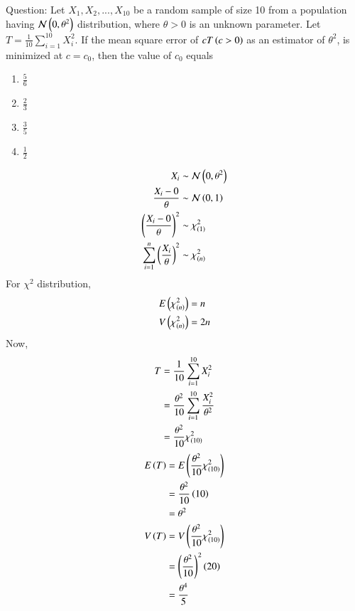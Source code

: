\documentclass[journal,12pt,onecolumn]{IEEEtran}
\theoremstyle{remark}
\begin{document}
%
Question:
Let $X_1, X_2, ..., X_{10}$ be a random sample of size 10 from a population having $\mathcal{N}\left(0,\theta^2\right)$ distribution, where $\theta > 0$ is an unknown parameter.
Let $T = \frac{1}{10}\sum^{10}_{i=1}{X_i^2}$. If the mean square error of $cT \left(c > 0\right)$ as an estimator of $\theta^2$, is minimized at $c = c_0$, then the value of $c_0$ equals
\begin{enumerate}[label =(\roman*)]
	\item $\frac{5}{6}$ \vspace{2pt}
	\item $\frac{2}{3}$ \vspace{2pt}
	\item $\frac{3}{5}$ \vspace{2pt}
	\item $\frac{1}{2}$ \vspace{2pt}
\end{enumerate}
\solution
\begin{align}
	X_i &\sim \mathcal{N}\left(0,\theta^2\right)\\
	\frac{X_i - 0}{\theta} &\sim \mathcal{N}\left(0,1\right)\\
	\left(\frac{X_i - 0}{\theta}\right)^2 &\sim \chi^2_{\left(1\right)}\\
	\sum^n_{i=1}{\left(\frac{X_i}{\theta}\right)^2} &\sim \chi^2_{\left(n\right)} 
\end{align}
For $\chi^2$ distribution,
\begin{align}
	E\left(\chi_{\left(n\right)}^2\right) &= n\\
	V\left(\chi_{\left(n\right)}^2\right) &= 2n
\end{align}
Now,
\begin{align}
	T &= \frac{1}{10}\sum^{10}_{i=1}{X_i^2}\\
	&= \frac{\theta^2}{10}\sum^{10}_{i=1}{\frac{X_i^2}{\theta^2}}\\
	&= \frac{\theta^2}{10}\chi^2_{\left(10\right)}
\end{align}
\begin{align}
	E\left(T\right) &= E\left(\frac{\theta^2}{10}\chi^2_{\left(10\right)}\right)\\
	&= \frac{\theta^2}{10}\left(10\right)\\
	&= \theta^2\\
	V\left(T\right) &= V\left(\frac{\theta^2}{10}\chi^2_{\left(10\right)}\right)\\
	&= \left(\frac{\theta^2}{10}\right)^2\left(20\right)\\
	&= \frac{\theta^4}{5}
\end{align}
\end{document}
